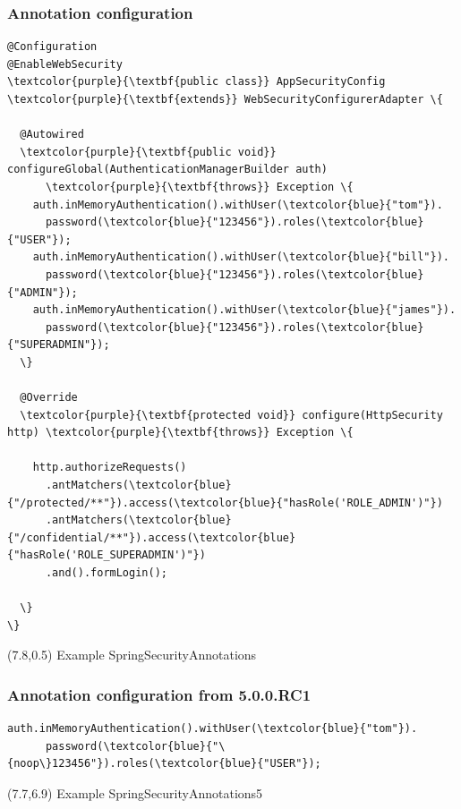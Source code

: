 \documentclass[10pt,xcolor=pdflatex, table]{beamer}
\begin{document}
\begin{frame}[fragile]\frametitle{Annotation configuration}
	\begin{Verbatim}[fontsize=\scriptsize, commandchars=\\\{\}]
@Configuration
@EnableWebSecurity
\textcolor{purple}{\textbf{public class}} AppSecurityConfig \textcolor{purple}{\textbf{extends}} WebSecurityConfigurerAdapter \{

  @Autowired
  \textcolor{purple}{\textbf{public void}} configureGlobal(AuthenticationManagerBuilder auth)
      \textcolor{purple}{\textbf{throws}} Exception \{
    auth.inMemoryAuthentication().withUser(\textcolor{blue}{"tom"}).
      password(\textcolor{blue}{"123456"}).roles(\textcolor{blue}{"USER"});
    auth.inMemoryAuthentication().withUser(\textcolor{blue}{"bill"}).
      password(\textcolor{blue}{"123456"}).roles(\textcolor{blue}{"ADMIN"});
    auth.inMemoryAuthentication().withUser(\textcolor{blue}{"james"}).
      password(\textcolor{blue}{"123456"}).roles(\textcolor{blue}{"SUPERADMIN"});
  \}

  @Override
  \textcolor{purple}{\textbf{protected void}} configure(HttpSecurity http) \textcolor{purple}{\textbf{throws}} Exception \{

    http.authorizeRequests()
      .antMatchers(\textcolor{blue}{"/protected/**"}).access(\textcolor{blue}{"hasRole('ROLE_ADMIN')"})
      .antMatchers(\textcolor{blue}{"/confidential/**"}).access(\textcolor{blue}{"hasRole('ROLE_SUPERADMIN')"})
      .and().formLogin();

  \}
\}
	\end{Verbatim}
\begin{textblock}{15}(7.8,0.5)
    {\footnotesize Example SpringSecurityAnnotations}
\end{textblock}
\end{frame}


\begin{frame}[fragile]\frametitle{Annotation configuration from 5.0.0.RC1}
	\begin{Verbatim}[fontsize=\scriptsize, commandchars=\\\{\}]
    auth.inMemoryAuthentication().withUser(\textcolor{blue}{"tom"}).
      password(\textcolor{blue}{"\{noop\}123456"}).roles(\textcolor{blue}{"USER"});
	\end{Verbatim}
\begin{textblock}{15}(7.7,6.9)
    {\footnotesize Example SpringSecurityAnnotations5}
\end{textblock}
\end{frame}
\end{document}
